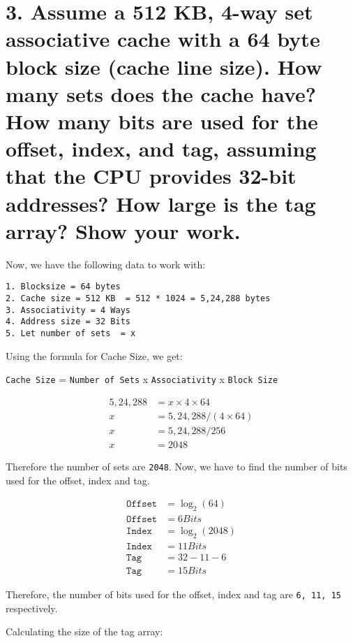 \documentclass[11pt]{article}
\begin{document}
\newpage

\section*{3. Assume a 512 KB, 4-way set associative cache with a 64 byte block size (cache line size). How many sets does the cache have? How many bits are used for the offset, index, and tag, assuming that the CPU provides 32-bit addresses? How large is the tag array? Show your work.}

Now, we have the following data to work with:
\begin{verbatim}
1. Blocksize = 64 bytes
2. Cache size = 512 KB  = 512 * 1024 = 5,24,288 bytes
3. Associativity = 4 Ways
4. Address size = 32 Bits
5. Let number of sets  = x
\end{verbatim}

Using the formula for Cache Size, we get:

\texttt{Cache Size} = \texttt{Number of Sets} x \texttt{Associativity} x \texttt{Block Size}

\begin{equation}
\begin{split}
5,24,288 &= x \times 4 \times 64 \\
x &= 5,24,288 / (4 \times 64) \\
x &= 5,24,288 /  256 \\
x &= 2048
\end{split}
\end{equation}

Therefore the number of sets are \texttt{2048}.
Now, we have to find the number of bits used for the offset, index and tag.

\begin{equation}
\begin{split}
\texttt{Offset} &= \log_2(64) \\
\texttt{Offset} &= 6 Bits\\
\texttt{Index} &= \log_2(2048) \\
\texttt{Index} &= 11 Bits\\
\texttt{Tag} &= 32 - 11 - 6 \\
\texttt{Tag} &= 15 Bits
\end{split}
\end{equation}
    
Therefore, the number of bits used for the offset, index and tag are \texttt{6, 11, 15} respectively.

Calculating the size of the tag array:
\end{document}
